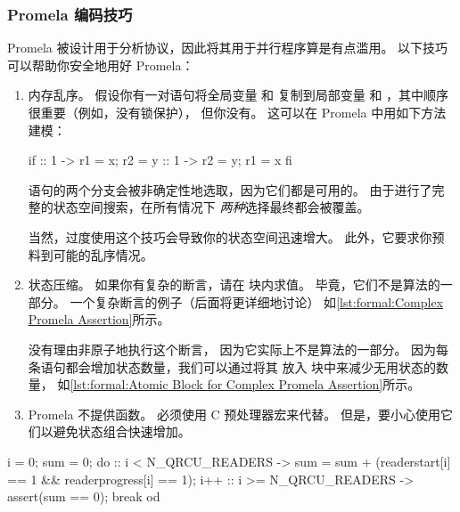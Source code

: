 \subsubsection{Promela 编码技巧}
\label{sec:formal:Promela Coding Tricks}

Promela 被设计用于分析协议，因此将其用于并行程序算是有点滥用。
以下技巧可以帮助你安全地用好 Promela：

\begin{enumerate}
\item	内存乱序。
	假设你有一对语句将全局变量  和 
	复制到局部变量  和 ，其中顺序很重要（例如，没有锁保护），
	但你没有。
	这可以在 Promela 中用如下方法建模：

\begin{VerbatimN}[samepage=true]
if
:: 1 -> r1 = x;
        r2 = y
:: 1 -> r2 = y;
        r1 = x
fi
\end{VerbatimN}

	 语句的两个分支会被非确定性地选取，因为它们都是可用的。
	由于进行了完整的状态空间搜索，在所有情况下
	\emph{两种}选择最终都会被覆盖。

	当然，过度使用这个技巧会导致你的状态空间迅速增大。
	此外，它要求你预料到可能的乱序情况。

\item	状态压缩。
	如果你有复杂的断言，请在  块内求值。
	毕竟，它们不是算法的一部分。
	一个复杂断言的例子（后面将更详细地讨论）
	如\cref{lst:formal:Complex Promela Assertion}所示。

	没有理由非原子地执行这个断言，
	因为它实际上不是算法的一部分。
	因为每条语句都会增加状态数量，我们可以通过将其
	放入  块中来减少无用状态的数量，
	如\cref{lst:formal:Atomic Block for Complex Promela Assertion}所示。

\item	Promela 不提供函数。
	必须使用 C 预处理器宏来代替。
	但是，要小心使用它们以避免状态组合快速增加。
\end{enumerate}

\begin{listing}
\begin{VerbatimL}
i = 0;
sum = 0;
do
:: i < N_QRCU_READERS ->
	sum = sum + (readerstart[i] == 1 &&
	             readerprogress[i] == 1);
	i++
:: i >= N_QRCU_READERS ->
	assert(sum == 0);
	break
od
\end{VerbatimL}
\caption{复杂的 Promela 断言}
\label{lst:formal:Complex Promela Assertion}
\end{listing}

